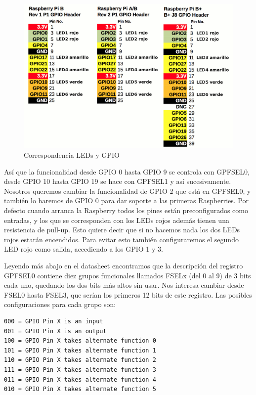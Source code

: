 \begin{figure}[h]
  \centering
    \includegraphics[width=14cm]{graphs/RaspberryGPIOaux.png}
  \caption{Correspondencia LEDs y GPIO}
  \label{fig:pinout}
\end{figure}

Así que la funcionalidad desde GPIO 0 hasta GPIO 9 se controla con
GPFSEL0, desde GPIO 10 hasta GPIO 19 se hace con GPFSEL1 y así
sucesivamente. Nosotros queremos cambiar la funcionalidad de GPIO 2
que está en GPFSEL0, y también lo haremos de GPIO 0 para dar soporte
a las primeras Raspberries. Por defecto cuando arranca la Raspberry
todos los pines están preconfigurados como entradas, y los que se
corresponden con los LEDs rojos además tienen una resistencia de pull-up.
Esto quiere decir que si no hacemos nada los dos LEDs rojos estarán
encendidos. Para evitar esto también configuraremos el segundo LED rojo
como salida, accediendo a los GPIO 1 y 3.

Leyendo más abajo en el datasheet encontramos que
la descripción del registro GPFSEL0 contiene diez grupos funcionales
llamados FSELx (del 0 al 9) de 3 bits cada uno, quedando los dos bits
más altos sin usar. Nos interesa cambiar desde FSEL0 hasta FSEL3, que serían los primeros
12 bits de este registro. Las posibles configuraciones para cada grupo son:

\begin{lstlisting}
000 = GPIO Pin X is an input
001 = GPIO Pin X is an output
100 = GPIO Pin X takes alternate function 0
101 = GPIO Pin X takes alternate function 1
110 = GPIO Pin X takes alternate function 2
111 = GPIO Pin X takes alternate function 3
011 = GPIO Pin X takes alternate function 4
010 = GPIO Pin X takes alternate function 5
\end{lstlisting}

